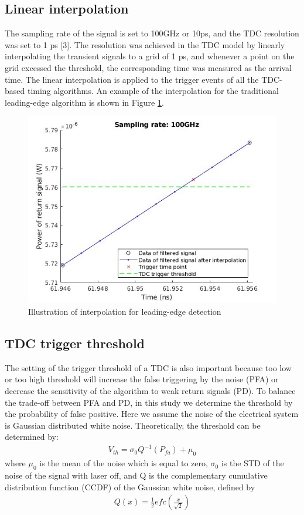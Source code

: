 \subsection{Linear interpolation}
The sampling rate of the signal is set to 100GHz or 10ps, and the TDC resolution was set to 1 ps [3]. The resolution was achieved in the TDC model by linearly interpolating the transient signals to a grid of 1 ps, and whenever a point on the grid excessed the threshold, the corresponding time was measured as the arrival time. The linear interpolation is applied to the trigger events of all the TDC-based timing algorithms. An example of the interpolation for the traditional leading-edge algorithm is shown in Figure \ref{fig:TDCinterpolation}.
\begin{figure}[t!p]
\centering
\includegraphics[width=.8\textwidth]{figures/chapter7_TDC/TDC_interpolation.jpg}
\caption{Illustration of interpolation for leading-edge detection }
\label{fig:TDCinterpolation}
\end{figure}
\subsection{TDC trigger threshold}
The setting of the trigger threshold of a TDC is also important because too low or too high threshold will increase the false triggering by the noise (PFA) or decrease the sensitivity of the algorithm to weak return signals (PD). To balance the trade-off between PFA and PD, in this study we determine the threshold by the probability of false positive. Here we assume the noise of the electrical system is Gaussian distributed white noise. Theoretically, the threshold can be determined by:
\begin{align} \label{eq:TDC_threshold}
    V_{th}=\sigma_0Q^{-1}\left(P_{fa}\right)+\mu_0
\end{align}
where $\mu_0$ is the mean of the noise which is equal to zero, $\sigma_0$ is the STD of the noise of the signal with laser off, and Q is the complementary cumulative distribution function (CCDF) of the Gaussian white noise, defined by
\begin{align}
    Q\left(x\right)=\frac{1}{2}efc\left(\frac{x}{\sqrt2}\right)
\end{align}
